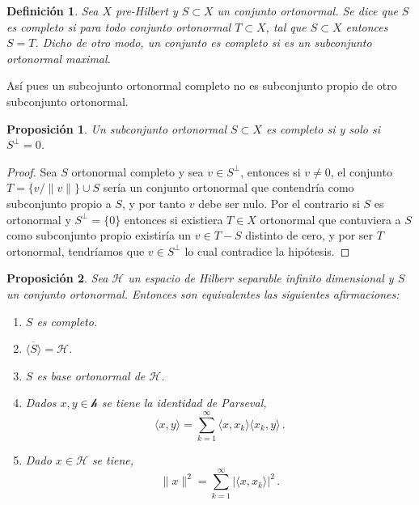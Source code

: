 \documentclass[12pt]{book}
\newtheorem{defn}{\bf Definición}[chapter]
\newtheorem{prop}{\bf Proposición}[chapter]
\newcommand{\abs}[1]{\lvert #1\rvert }
\newcommand{\norm}[1]{\lVert #1\rVert }
\newcommand{\lin}[1]{\langle #1 \rangle}
\begin{document}
 
\begin{defn} Sea $X$ pre-Hilbert y $S\subset X$ un conjunto ortonormal. Se dice que $S$ es completo si para todo conjunto ortonormal $T\subset X$, tal que  $S\subset X$ entonces $S=T$. Dicho de otro modo, un  conjunto   es completo si es un subconjunto ortonormal maximal.
\end{defn}
Así pues un subcojunto ortonormal  completo  no es subconjunto propio  de otro subconjunto ortonormal.
\begin{prop}
Un subconjunto ortonormal $S\subset X$ es completo si y solo si $S^\perp =0$.
\end{prop}
\begin{proof} 
Sea $S$ ortonormal completo y sea  $v\in S^\perp$, entonces si $v\not=0$, el conjunto $T=\{v/\norm{v}\}\cup S$ sería un conjunto ortonormal que contendría como subconjunto propio a $S$, y por tanto $v$ debe ser nulo. Por el contrario si $S$  es ortonormal y $S^\perp=\{0\}$ entonces si existiera $T\in X$ ortonormal que contuviera a $S$ como subconjunto propio existiría un $v\in T-S$ distinto de cero, y por ser $T$ ortonormal, tendríamos que  $v\in S^\perp$ lo cual contradice la hipótesis.
\end{proof}
\begin{prop} Sea $\mathcal{H}$ un espacio de Hilberr separable infinito dimensional y $S$ un conjunto ortonormal. Entonces son equivalentes las siguientes afirmaciones:
\begin{enumerate}
\renewcommand{\labelenumi}{\roman{enumi})}
\item[i)] $S$  es completo.
\item[ii)] $\overline{\lin{S}}=\mathcal{H}$.
\item[iii)] $S$ es base ortonormal de $\mathcal{H}$.
\item[iv)] Dados $x,y\in \mathcal{h}$ se tiene la {\emph identidad de Parseval},
$$\lin{x,y} =\sum_{k=1}^\infty  \lin{x, x_k}\lin{x_k,y}\,.$$
\item[v)]  Dado $x\in \mathcal{H}$ se tiene,
$$\norm{x}^2=\sum_{k=1}^\infty \abs{\lin{x,x_k}}^2\,.$$
\end{enumerate}
\end{prop}
\end{document}
